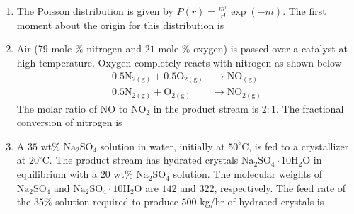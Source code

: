 \documentclass[journal,12pt,onecolumn]{IEEEtran}
\theoremstyle{remark}
\begin{document}
\begin{enumerate}
\item The Poisson distribution is given by $P(r) = \frac{m^r}{r!} \exp(-m)$. The first moment about the origin for this distribution is
\hfill{}
\begin{enumerate}
\end{enumerate}

\item Air ($79$ mole $\%$ nitrogen and $21$ mole $\%$ oxygen) is passed over a catalyst at high temperature. Oxygen completely reacts with nitrogen as shown below
\hfill{}
\[\begin{aligned}    0.5 \mathrm{N}_{2(\mathrm{g})} + 0.5 \mathrm{O}_{2(\mathrm{g})} &\rightarrow \mathrm{NO}_{(\mathrm{g})} \\    0.5 \mathrm{N}_{2(\mathrm{g})} + \mathrm{O}_{2(\mathrm{g})} &\rightarrow \mathrm{NO}_{2(\mathrm{g})}\end{aligned}\]
The molar ratio of $\mathrm{NO}$ to $\mathrm{NO}_2$ in the product stream is $2:1$. The fractional conversion of nitrogen is
\hfill{}
\begin{enumerate}
\end{enumerate}

\item A $35$ wt$\%$ $\mathrm{Na}_2\mathrm{SO}_4$ solution in water, initially at $50^\circ\mathrm{C}$, is fed to a crystallizer at $20^\circ\mathrm{C}$. The product stream has hydrated crystals $\mathrm{Na}_2\mathrm{SO}_4\cdot10\mathrm{H}_2\mathrm{O}$ in equilibrium with a $20$ wt$\%$ $\mathrm{Na}_2\mathrm{SO}_4$ solution. The molecular weights of $\mathrm{Na}_2\mathrm{SO}_4$ and $\mathrm{Na}_2\mathrm{SO}_4\cdot10\mathrm{H}_2\mathrm{O}$ are $142$ and $322$, respectively. The feed rate of the $35\%$ solution required to produce $500$ kg/hr of hydrated crystals is
\hfill{}
\begin{enumerate}
\end{enumerate}


\end{enumerate}
\end{document}
